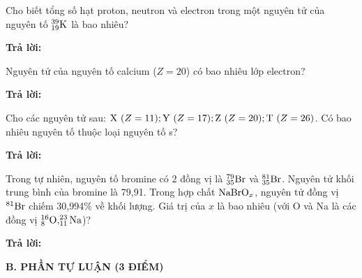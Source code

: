 \documentclass[11pt,a4paper]{article}
\begin{document}
\begin{ex}
Cho biết tổng số hạt proton, neutron và electron trong một nguyên tử của nguyên tố $^{39}_{19}\ce{K}$ là bao nhiêu?
\par\textbf{Trả lời:} \dotfill\end{ex}
\begin{ex}
Nguyên tử của nguyên tố calcium ($Z = 20$) có bao nhiêu lớp electron?
\par\textbf{Trả lời:} \dotfill\end{ex}
\begin{ex}
Cho các nguyên tử sau: $\ce{X}\ (Z = 11); \ce{Y}\ (Z = 17); \ce{Z}\ (Z = 20); \ce{T}\ (Z = 26)$. Có bao nhiêu nguyên tố thuộc loại nguyên tố s?
\par\textbf{Trả lời:} \dotfill\end{ex}
\begin{ex}
Trong tự nhiên, nguyên tố bromine có 2 đồng vị là $^{79}_{35}\ce{Br}$ và $^{81}_{35}\ce{Br}$. Nguyên tử khối trung bình của bromine là 79,91. Trong hợp chất $\ce{NaBrO}_x$, nguyên tử đồng vị $^{81}\ce{Br}$ chiếm 30,994\% về khối lượng. Giá trị của $x$ là bao nhiêu (với O và Na là các đồng vị $^{16}_8\ce{O}, ^{23}_{11}\ce{Na}$)?
\par\textbf{Trả lời:} \dotfill\end{ex}
\vspace{6pt}
\noindent
{\color{mainGreen}\textbf{\Large B. PHẦN TỰ LUẬN (3 ĐIỂM)}}
\vspace{3pt}
\end{document}
